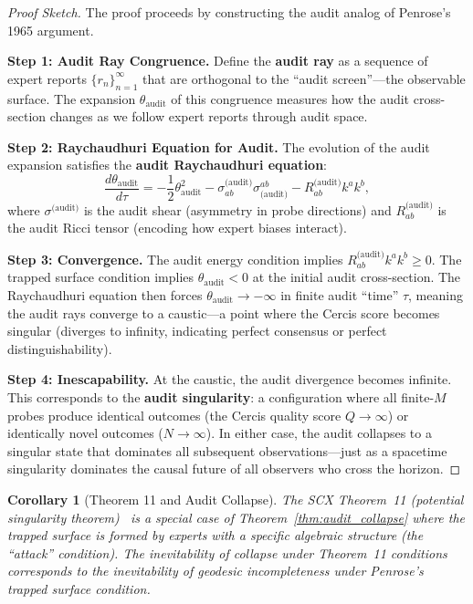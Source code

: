 \documentclass[12pt,a4paper]{article}
\newtheorem{corollary}[theorem]{Corollary}
\theoremstyle{remark}
\newcommand{\Cercis}{\textsf{Cercis}}
\begin{document}
\begin{proof}[Proof Sketch]
The proof proceeds by constructing the audit analog of Penrose's 1965 argument.

\smallskip
\noindent\textbf{Step 1: Audit Ray Congruence.}
Define the \textbf{audit ray} as a sequence of expert reports $\{r_n\}_{n=1}^{\infty}$ that are orthogonal to the ``audit screen''---the observable surface. The expansion $\theta_{\text{audit}}$ of this congruence measures how the audit cross-section changes as we follow expert reports through audit space.

\smallskip
\noindent\textbf{Step 2: Raychaudhuri Equation for Audit.}
The evolution of the audit expansion satisfies the \textbf{audit Raychaudhuri equation}:
\begin{equation}
  \frac{d\theta_{\text{audit}}}{d\tau} = -\frac{1}{2}\theta_{\text{audit}}^2 - \sigma_{ab}^{\text{(audit)}}\sigma^{ab}_{\text{(audit)}} - R_{ab}^{\text{(audit)}} k^a k^b,
\end{equation}
where $\sigma^{\text{(audit)}}$ is the audit shear (asymmetry in probe directions) and $R_{ab}^{\text{(audit)}}$ is the audit Ricci tensor (encoding how expert biases interact).

\smallskip
\noindent\textbf{Step 3: Convergence.}
The audit energy condition implies $R_{ab}^{\text{(audit)}} k^a k^b \geq 0$. The trapped surface condition implies $\theta_{\text{audit}} < 0$ at the initial audit cross-section. The Raychaudhuri equation then forces $\theta_{\text{audit}} \to -\infty$ in finite audit ``time'' $\tau$, meaning the audit rays converge to a caustic---a point where the \Cercis{} score becomes singular (diverges to infinity, indicating perfect consensus or perfect distinguishability).

\smallskip
\noindent\textbf{Step 4: Inescapability.}
At the caustic, the audit divergence becomes infinite. This corresponds to the \textbf{audit singularity}: a configuration where all finite-$M$ probes produce identical outcomes (the \Cercis{} quality score $Q \to \infty$) or identically novel outcomes ($N \to \infty$). In either case, the audit collapses to a singular state that dominates all subsequent observations---just as a spacetime singularity dominates the causal future of all observers who cross the horizon.
\end{proof}

\begin{corollary}[Theorem 11 and Audit Collapse]
\label{cor:thm11_collapse}
The SCX Theorem~11 (potential singularity theorem)~\cite{scx_theory} is a special case of Theorem~\ref{thm:audit_collapse} where the trapped surface is formed by experts with a specific algebraic structure (the ``attack'' condition). The inevitability of collapse under Theorem~11 conditions corresponds to the inevitability of geodesic incompleteness under Penrose's trapped surface condition.
\end{corollary}
\end{document}
